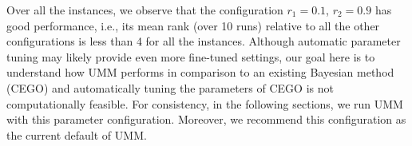\documentclass[sigconf,dvipsnames]{acmart}
\begin{document}
Over all the instances, we observe that the configuration $r_1 =0.1$, $r_2=0.9$
has good performance, i.e., its mean rank (over 10 runs) relative to all the
other configurations is less than 4 for all the instances.  Although automatic
parameter tuning may likely provide even more fine-tuned settings, our goal
here is to understand how UMM performs in comparison to an existing Bayesian
method (CEGO) and automatically tuning the parameters of CEGO is not
computationally feasible.  For consistency, in the following sections, we run
UMM with this parameter configuration.  Moreover, we recommend this
configuration as the current default of UMM.

%
%
%
%
\end{document}
